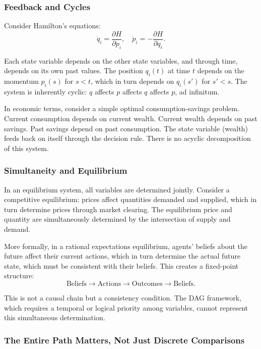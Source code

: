 \documentclass[12pt]{article}
\begin{document}
\subsubsection{Feedback and Cycles}

Consider Hamilton's equations:
\[
\dot{q}_i = \frac{\partial H}{\partial p_i}, \quad \dot{p}_i = -\frac{\partial H}{\partial q_i}.
\]

Each state variable depends on the other state variables, and through time, depends on its own past values. The position $q_i(t)$ at time $t$ depends on the momentum $p_i(s)$ for $s < t$, which in turn depends on $q_i(s')$ for $s' < s$. The system is inherently cyclic: $q$ affects $p$ affects $q$ affects $p$, ad infinitum.

In economic terms, consider a simple optimal consumption-savings problem. Current consumption depends on current wealth. Current wealth depends on past savings. Past savings depend on past consumption. The state variable (wealth) feeds back on itself through the decision rule. There is no acyclic decomposition of this system.

\subsubsection{Simultaneity and Equilibrium}

In an equilibrium system, all variables are determined jointly. Consider a competitive equilibrium: prices affect quantities demanded and supplied, which in turn determine prices through market clearing. The equilibrium price and quantity are simultaneously determined by the intersection of supply and demand.

More formally, in a rational expectations equilibrium, agents' beliefs about the future affect their current actions, which in turn determine the actual future state, which must be consistent with their beliefs. This creates a fixed-point structure:
\[
\text{Beliefs} \to \text{Actions} \to \text{Outcomes} \to \text{Beliefs}.
\]

This is not a causal chain but a consistency condition. The DAG framework, which requires a temporal or logical priority among variables, cannot represent this simultaneous determination.

\subsubsection{The Entire Path Matters, Not Just Discrete Comparisons}
\end{document}
